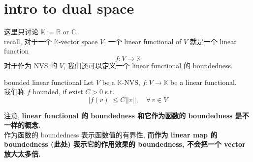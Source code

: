 \documentclass[lang=cn,11pt]{elegantbook}
\begin{document}
\section{intro to dual space}
这里只讨论 $\mathbb{K} := \mathbb{R}$ or $\mathbb{C}$.\\
recall, 对于一个 $\mathbb{K}$-vector space $V$, 一个 linear functional of $V$ 就是一个 linear function \[
f:V \to \mathbb{K}
\]
对于作为 NVS 的 $V$, 我们还可以定义一个 linear functional 的 boundedness. 
\begin{definition}{bounded linear functional }
 Let $V$ be a $\mathbb{K}$-NVS, $f:V \to \mathbb{K}$ be a linear functional.\\
 我们称 $f$ bounded, if exist $C>0$ s.t. \[
|f(v)| \leq C||v||,\quad \forall \,v \in V
\]
\end{definition}
\begin{remark}
注意, \textbf{linear functional 的 boundedness 和它作为函数的 boundedness 是不一样的概念.}\\
作为函数的 boundedness 表示函数值的有界性, 而\textbf{作为  linear map 的 boundedness (此处) 表示它的作用效果的 boundedness, 不会把一个 vector 放大太多倍.}
\end{remark}
\end{document}
